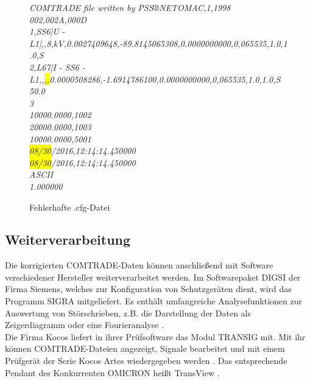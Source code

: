 \documentclass{scrartcl}
\begin{document}
\begin{onehalfspace}
\begin{figure}[H]
\textit{COMTRADE file written by PSS®NETOMAC,1,1998 \\
002,002A,000D \\
1,SS6|U - L1|,,8,kV,0.0027409648,-89.8145065308,0.0000000000,0,065535,1.0,1.0,S \\
2,L67|I - SS6 - L1,,\colorbox{yellow}{,,}0.0000508286,-1.6914786100,0.0000000000,0,065535,1.0,1.0,S \\
50.0 \\
3 \\
10000.0000,1002 \\
20000.0000,1003 \\
10000.0000,5001 \\
\colorbox{yellow}{08/30}/2016,12:14:14.450000 \\
\colorbox{yellow}{08/30}/2016,12:14:14.450000 \\
ASCII \\
1.000000}
\caption{Fehlerhafte .cfg-Datei}
\end{figure}

\subsection{Weiterverarbeitung}
Die korrigierten COMTRADE-Daten können anschließend mit Software verschiedener Hersteller weiterverarbeitet werden. Im Softwarepaket DIGSI der Firma Siemens, welches zur Konfiguration von Schutzgeräten dient, wird das Programm SIGRA mitgeliefert. Es enthält umfangreiche Analysefunktionen zur Auswertung von Störschrieben, z.B. die Darstellung der Daten als Zeigerdiagramm oder eine Fourieranalyse \cite{siemens-sigra}. \\
Die Firma Kocos liefert in ihrer Prüfsoftware das Modul TRANSIG mit. Mit ihr können COMTRADE-Dateien angezeigt, Signale bearbeitet und mit einem Prüfgerät der Serie Kocos Artes wiedergegeben werden \cite{kocos-transig}. Das entsprechende Pendant des Konkurrenten OMICRON heißt TransView \cite{omicron-transview}.


\end{onehalfspace}
\end{document}
